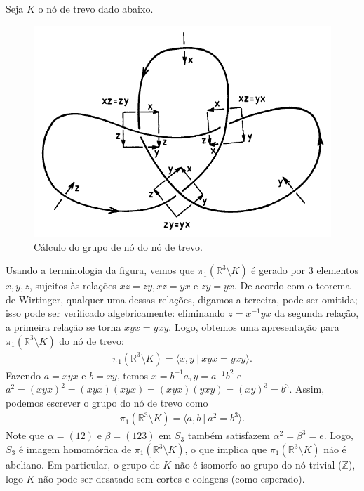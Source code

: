 	\begin{example}[Nó de trevo]
		Seja $K$ o nó de trevo dado abaixo.
		\begin{figure}[H]
			\begin{center}
				\includegraphics[width=12cm]{Images/gruponotrevo.png}
			\end{center}\caption{Cálculo do grupo de nó do nó de trevo.}
			\label{grupo no de trevo}
		\end{figure}
		Usando a terminologia da figura, vemos que $\pi_1(\mathbb{R}^3\setminus K)$ é 
		gerado por $3$ elementos $x, y, z$, sujeitos às relações $xz = zy, xz = yx$ e $zy = yx$. 
		De acordo com o teorema de Wirtinger, qualquer uma dessas relações, digamos a terceira, 
		pode ser omitida; isso pode ser verificado algebricamente: eliminando $z = x^{-1}yx$ da 
		segunda relação, a primeira relação se torna $xyx = yxy$. Logo, obtemos uma apresentação 
		para $\pi_1(\mathbb{R}^3\setminus K)$ do nó de trevo:
		\begin{align*}
		    \pi_1(\mathbb{R}^3\setminus K) = \langle x,y \ | \ xyx = yxy \rangle.
		\end{align*}
		Fazendo $a = xyx$ e $b = xy$, temos $x = b^{-1}a, y = a^{-1}b^2$ e 
		$a^2 = (xyx)^2 = (xyx)(xyx) = (xyx)(yxy) = (xy)^3 = b^3$. 
		Assim, podemos escrever o grupo do nó de trevo como
		\begin{align*}
		    \pi_1(\mathbb{R}^3\setminus K) = \langle a,b \ | \ a^2 = b^3 \rangle.
		\end{align*}
		Note que $\alpha = (12)$ e $\beta = (123)$ em $S_3$ também satisfazem $\alpha^2 = \beta^3 = e$. 
		Logo, $S_3$ é imagem homomórfica de $\pi_1(\mathbb{R}^3\setminus K)$, o que implica que
		$\pi_1(\mathbb{R}^3\setminus K)$ não é abeliano. Em particular, o grupo de $K$ não é 
		isomorfo ao grupo do nó trivial ($\mathbb{Z}$), logo $K$ não pode ser desatado sem 
		cortes e colagens (como esperado).
	\end{example}
